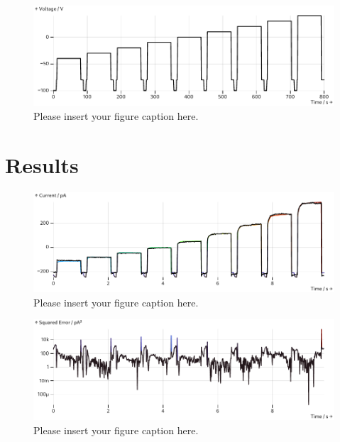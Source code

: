\documentclass[USenglish,twocolumn]{article}
\begin{document}
  \begin{figure}
    \includegraphics[width=\columnwidth]{../figures/results/voltage-protocol.pdf}
    \caption{Please insert your figure caption here.}
    \label{figure:voltage-protocol}
  \end{figure}

  \section{Results}
  \begin{figure}[h]
    \includegraphics[width=\columnwidth]{../figures/results/full-simulation-current.pdf}
    \caption{Please insert your figure caption here.}
    \label{figure:full-simulation-current}
  \end{figure}
  \begin{figure}
    \includegraphics[width=\columnwidth]{../figures/results/simulation-error.pdf}
    \caption{Please insert your figure caption here.}
    \label{figure:simulation-error}
  \end{figure}
\end{document}
